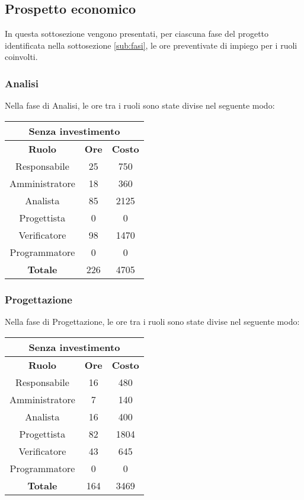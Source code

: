 \documentclass{scalatekids-article}
\begin{document}
\subsection{Prospetto economico}
In questa sottosezione vengono presentati, per ciascuna fase del progetto identificata
nella sottosezione \ref{sub:fasi}, le ore preventivate di impiego per i ruoli coinvolti.
\subsubsection{Analisi}
Nella fase di Analisi, le ore tra i ruoli sono state divise nel seguente modo:
\begin{center}
  \normalsize
  \begin{tabular}{| c | c | c |}
    \hline
    \multicolumn{3}{|c|}{\textbf{Senza investimento}}\\
    \hline
    \textbf{Ruolo} & \textbf{Ore} & \textbf{Costo}\\
    \hline
    Responsabile & 25 & 750\\
    Amministratore & 18 & 360\\
    Analista & 85 & 2125\\
    Progettista & 0 & 0\\
    Verificatore & 98 & 1470 \\
    Programmatore & 0 & 0 \\
    \hline
    \textbf{Totale} & 226 & 4705\\
    \hline
  \end{tabular}
\end{center}
\subsubsection{Progettazione}
Nella fase di Progettazione, le ore tra i ruoli sono state divise nel seguente modo:
\begin{center}
  \normalsize
  \begin{tabular}{| c | c | c |}
    \hline
    \multicolumn{3}{|c|}{\textbf{Senza investimento}}\\
    \hline
    \textbf{Ruolo} & \textbf{Ore} & \textbf{Costo}\\
    \hline
    Responsabile & 16 & 480\\
    Amministratore & 7 & 140\\
    Analista & 16 & 400\\
    Progettista & 82 & 1804\\
    Verificatore & 43 & 645 \\
    Programmatore & 0 & 0 \\
    \hline
    \textbf{Totale} & 164 & 3469\\
    \hline
  \end{tabular}
\end{center}
\end{document}
